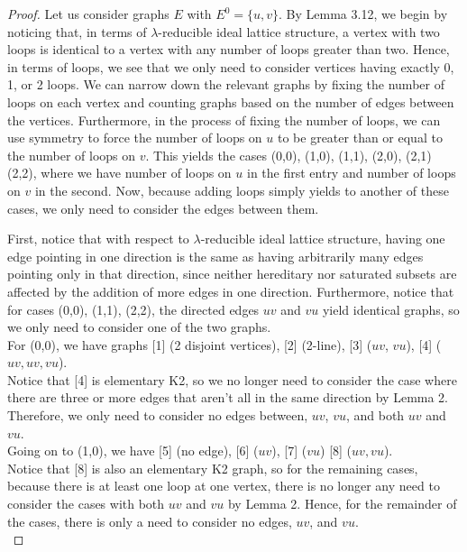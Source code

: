 \documentclass[12pt]{amsart}
\theoremstyle{plain} \numberwithin{equation}{section}
\theoremstyle{definition}
\theoremstyle{definition}
\begin{document}
\begin{proof} 
Let us consider graphs $E$ with $E^0 = \{ u,v \}$. By Lemma 3.12, we begin by noticing that, in terms of $\lambda$-reducible ideal lattice structure, a vertex with two loops is identical to a vertex with any number of loops greater than two. Hence, in terms of loops, we see that we only need to consider vertices having exactly 0, 1, or 2 loops. We can narrow down the relevant graphs by fixing the number of loops on each vertex and counting graphs based on the number of edges between the vertices. Furthermore, in the process of fixing the number of loops, we can use symmetry to force the number of loops on $u$ to be greater than or equal to the number of loops on $v$. This yields the cases (0,0), (1,0), (1,1), (2,0), (2,1) (2,2), where we have number of loops on $u$ in the first entry and number of loops on $v$ in the second. Now, because adding loops simply yields to another of these cases, we only need to consider the edges between them. 

First, notice that with respect to $\lambda$-reducible ideal lattice structure, having one edge pointing in one direction is the same as having arbitrarily many edges pointing only in that direction, since neither hereditary nor saturated subsets are affected by the addition of more edges in one direction. Furthermore, notice that for cases (0,0), (1,1), (2,2), the directed edges $uv$ and $vu$ yield identical graphs, so we only need to consider one of the two graphs. \\

For (0,0), we have graphs [1] (2 disjoint vertices), [2] (2-line), [3] ($uv$, $vu$), [4] ($uv, uv, vu$). \\

Notice that [4] is elementary K2, so we no longer need to consider the case where there are three or more edges that aren't all in the same direction by Lemma 2. Therefore, we only need to consider no edges between, $uv$, $vu$, and both $uv$ and $vu$. \\

Going on to (1,0), we have [5] (no edge), [6] ($uv$), [7] ($vu$) [8] ($uv, vu$). \\

Notice that [8] is also an elementary K2 graph, so for the remaining cases, because there is at least one loop at one vertex, there is no longer any need to consider the cases with both $uv$ and $vu$ by Lemma 2. Hence, for the remainder of the cases, there is only a need to consider no edges, $uv$, and $vu$. \\


\end{proof}
\end{document}
